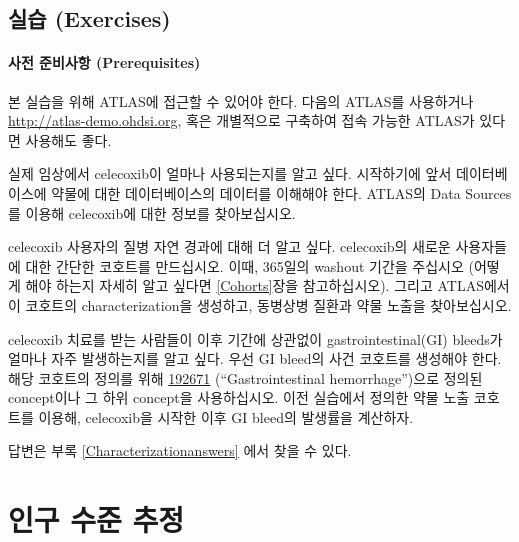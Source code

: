 \documentclass[11pt]{book}
\theoremstyle{definition}
\theoremstyle{definition}
\theoremstyle{definition}
\theoremstyle{remark}
\let\BeginKnitrBlock\begin \let\EndKnitrBlock\end
\begin{document}
\section{실습 (Exercises)}\label{-exercises}

\subsubsection*{사전 준비사항 (Prerequisites)}\label{--prerequisites}

본 실습을 위해 ATLAS에 접근할 수 있어야 한다. 다음의 ATLAS를 사용하거나
\url{http://atlas-demo.ohdsi.org}, 혹은 개별적으로 구축하여 접속 가능한
ATLAS가 있다면 사용해도 좋다.

\BeginKnitrBlock{exercise}
\protect\hypertarget{exr:exerciseCharacterization1}{}{\label{exr:exerciseCharacterization1}
}실제 임상에서 celecoxib이 얼마나 사용되는지를 알고 싶다. 시작하기에
앞서 데이터베이스에 약물에 대한 데이터베이스의 데이터를 이해해야 한다.
ATLAS의 Data Sources를 이용해 celecoxib에 대한 정보를 찾아보십시오.
\EndKnitrBlock{exercise}

\BeginKnitrBlock{exercise}
\protect\hypertarget{exr:exerciseCharacterization2}{}{\label{exr:exerciseCharacterization2}
}celecoxib 사용자의 질병 자연 경과에 대해 더 알고 싶다. celecoxib의
새로운 사용자들에 대한 간단한 코호트를 만드십시오. 이때, 365일의 washout
기간을 주십시오 (어떻게 해야 하는지 자세히 알고 싶다면 \ref{Cohorts}장을
참고하십시오). 그리고 ATLAS에서 이 코호트의 characterization을 생성하고,
동병상병 질환과 약물 노출을 찾아보십시오.
\EndKnitrBlock{exercise}

\BeginKnitrBlock{exercise}
\protect\hypertarget{exr:exerciseCharacterization3}{}{\label{exr:exerciseCharacterization3}
}celecoxib 치료를 받는 사람들이 이후 기간에 상관없이
gastrointestinal(GI) bleeds가 얼마나 자주 발생하는지를 알고 싶다. 우선
GI bleed의 사건 코호트를 생성해야 한다. 해당 코호트의 정의를 위해
\href{http://athena.ohdsi.org/search-terms/terms/192671}{192671}
(``Gastrointestinal hemorrhage'')으로 정의된 concept이나 그 하위
concept을 사용하십시오. 이전 실습에서 정의한 약물 노출 코호트를 이용해,
celecoxib을 시작한 이후 GI bleed의 발생률을 계산하자.
\EndKnitrBlock{exercise}

답변은 부록 \ref{Characterizationanswers} 에서 찾을 수 있다.

\chapter{인구 수준 추정}\label{PopulationLevelEstimation}
\end{document}
